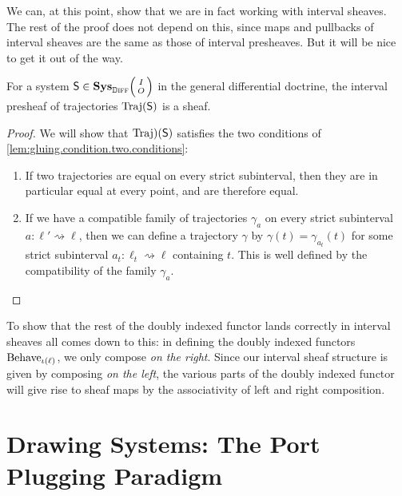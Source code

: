 \documentclass[DynamicalBook]{subfiles}
\begin{document}
  We can, at this point, show that we are in fact working with interval sheaves. The rest of the proof does not depend on this, since maps and pullbacks of interval sheaves are the same as those of interval presheaves. But it will be nice to get it out of the way.
  \begin{lemma}
  For a system $\Sys{S} \in \Cat{Sys}_{{\diffdoc}}\littlelens{I}{O}$ in the general differential doctrine, the interval presheaf of trajectories $\mathrm{Traj}(\mathsf{S})$ is a sheaf.
  \end{lemma}
  \begin{proof}
We will show that $\mathrm{Traj})(\mathsf{S})$ satisfies the two conditions of \cref{lem:gluing.condition.two.conditions}:
\begin{enumerate}
\item If two trajectories are equal on every strict subinterval, then they are in particular equal at every point, and are therefore equal.
\item If we have a compatible family of trajectories $\gamma_a$ on every strict subinterval $a : \ell' \rightsquigarrow \ell$, then we can define a trajectory $\gamma$ by $\gamma(t) = \gamma_{a_{t}}(t)$ for some strict subinterval $a_{t} : \ell_{t} \rightsquigarrow \ell$ containing $t$. This is well defined by the compatibility of the family $\gamma_{a}$.
        \end{enumerate}
  \end{proof}

To show that the rest of the doubly indexed functor lands correctly in interval sheaves all comes down to this: in defining the doubly indexed functors $\mathrm{Behave}_{{\iota(\ell)}}$, we only compose \emph{on the right}. Since our interval sheaf structure is given by composing \emph{on the left}, the various parts of the doubly indexed functor will give rise to sheaf maps by the associativity of left and right composition.

\section{Drawing Systems: The Port Plugging Paradigm}\label{sec:diagram.approach}
\end{document}
